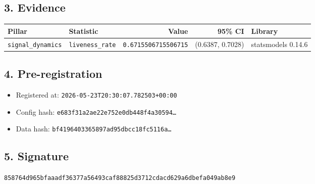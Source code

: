 \documentclass{article}
\begin{document}
\subsection*{3. Evidence}
\begin{tabular}{llrrl}\toprule
\textbf{Pillar} & \textbf{Statistic} & \textbf{Value} & \textbf{95\% CI} & \textbf{Library} \\\midrule
\texttt{signal\_dynamics} & \texttt{liveness\_rate} & \texttt{0.6715506715506715} & (0.6387, 0.7028) & statsmodels 0.14.6 \\
\bottomrule\end{tabular}
\subsection*{4. Pre-registration}
\begin{itemize}
\item Registered at: \texttt{2026-05-23T20:30:07.782503+00:00}
\item Config hash: \texttt{e683f31a2ae22e752e0db448f4a30594\dots}
\item Data hash: \texttt{bf4196403365897ad95dbcc18fc5116a\dots}
\end{itemize}
\subsection*{5. Signature}
\texttt{858764d965bfaaadf36377a56493caf88825d3712cdacd629a6dbefa049ab8e9}\\
\end{document}
